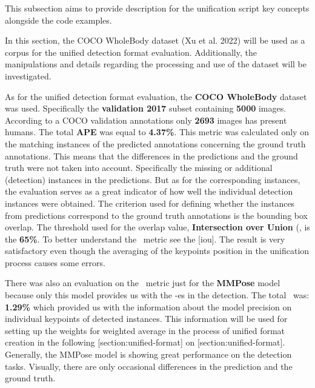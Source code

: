 This subsection aims to provide description for the unification script key concepts alongside the code examples.

In this section, the COCO WholeBody dataset (Xu et al. 2022) will be used as a corpus for the unified detection format evaluation. Additionally, the manipulations and details regarding the processing and use of the dataset will be investigated.

As for the unified detection format evaluation, the {\bf COCO WholeBody} dataset was used. Specifically the {\bf validation 2017} subset containing {\bf 5000} images. According to a COCO validation annotations only {\bf 2693} images has present humans. The total {\bf APE} was equal to {\bf 4.37\%}. This metric was calculated only on the matching instances of the predicted annotations concerning the ground truth annotations. This means that the differences in the predictions and the ground truth were not taken into account. Specifically the missing or additional (detection) instances in the predictions. But as for the corresponding instances, the evaluation serves as a great indicator of how well the individual detection instances were obtained. The criterion used for defining whether the instances from predictions correspond to the ground truth annotations is the bounding box overlap. The threshold used for the overlap value, {\bf Intersection over Union} (\IoU\), is the {\bf 65\%}. To better understand the \IoU\ metric see the [iou]. The result is very satisfactory even though the averaging of the keypoints position in the unification process causes some errors.


There was also an evaluation on the \APE\ metric just for the {\bf MMPose} model because only this model provides us with the \BBOX\--es in the detection. The total \APE\ was: {\bf 1.29\%} which provided us with the information about the model precision on individual keypoints of detected instances. This information will be used for setting up the weights for weighted average in the process of unified format creation in the following [section:unified-format] on [section:unified-format]. Generally, the MMPose model is showing great performance on the detection tasks. Visually, there are only occasional differences in the prediction and the ground truth.

